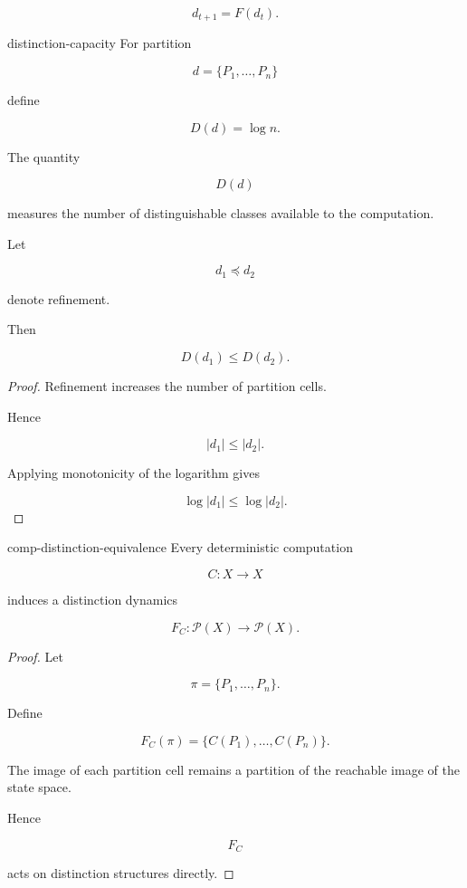 \documentclass[12pt,twoside,openright]{book}
\newenvironment{prop}
{\begin{proposition}{}{}}
{\end{proposition}}
\begin{document}
\[
d_{t+1}
=
F(d_t).
\]

\begin{definition}{distinction-capacity}
For partition

\[
d
=
\{P_1,\ldots,P_n\}
\]

define

\[
D(d)
=
\log n.
\]
\end{definition}

The quantity

\[
D(d)
\]

measures the number of distinguishable classes available
to the computation.

\begin{prop}
Let

\[
d_1
\preceq
d_2
\]

denote refinement.

Then

\[
D(d_1)
\le
D(d_2).
\]
\end{prop}

\begin{proof}
Refinement increases the number of partition cells.

Hence

\[
|d_1|
\le
|d_2|.
\]

Applying monotonicity of the logarithm gives

\[
\log|d_1|
\le
\log|d_2|.
\]
\end{proof}

\begin{theorem}{comp-distinction-equivalence}
Every deterministic computation

\[
C:X\rightarrow X
\]

induces a distinction dynamics

\[
F_C:\mathcal P(X)\rightarrow\mathcal P(X).
\]
\end{theorem}

\begin{proof}
Let

\[
\pi
=
\{P_1,\ldots,P_n\}.
\]

Define

\[
F_C(\pi)
=
\{
C(P_1),
\ldots,
C(P_n)
\}.
\]

The image of each partition cell remains a partition of
the reachable image of the state space.

Hence

\[
F_C
\]

acts on distinction structures directly.
\end{proof}
\end{document}
